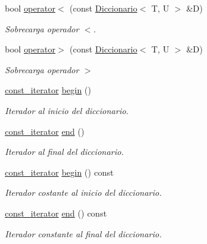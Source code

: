\begin{DoxyCompactItemize}
bool \hyperlink{classDiccionario_ad8ad2b8e7bb2fb099518e6fe2b70e4de}{operator$<$} (const \hyperlink{classDiccionario}{Diccionario}$<$ T, U $>$ \&D)
\begin{DoxyCompactList}\small\item\em Sobrecarga operador $<$. \end{DoxyCompactList}\item 
bool \hyperlink{classDiccionario_aed2afab1a51dd0d9805f294ff078ed7c}{operator$>$} (const \hyperlink{classDiccionario}{Diccionario}$<$ T, U $>$ \&D)
\begin{DoxyCompactList}\small\item\em Sobrecarga operador $>$ \end{DoxyCompactList}\item 
\mbox{\label{classDiccionario_af3c85ed51d02f1d982bf896bc74846a2}} 
\hyperlink{classDiccionario_1_1const__iterator}{const\+\_\+iterator} \hyperlink{classDiccionario_af3c85ed51d02f1d982bf896bc74846a2}{begin} ()
\begin{DoxyCompactList}\small\item\em Iterador al inicio del diccionario. \end{DoxyCompactList}\item 
\mbox{\label{classDiccionario_aa6f9f59a1f6478b7ff61369132fb4061}} 
\hyperlink{classDiccionario_1_1const__iterator}{const\+\_\+iterator} \hyperlink{classDiccionario_aa6f9f59a1f6478b7ff61369132fb4061}{end} ()
\begin{DoxyCompactList}\small\item\em Iterador al final del diccionario. \end{DoxyCompactList}\item 
\mbox{\label{classDiccionario_a0218f5f4801a39ac0c54d0d237d0c4ac}} 
\hyperlink{classDiccionario_1_1const__iterator}{const\+\_\+iterator} \hyperlink{classDiccionario_a0218f5f4801a39ac0c54d0d237d0c4ac}{begin} () const
\begin{DoxyCompactList}\small\item\em Iterador costante al inicio del diccionario. \end{DoxyCompactList}\item 
\mbox{\label{classDiccionario_a7a227d9a397c6936df480011236e9659}} 
\hyperlink{classDiccionario_1_1const__iterator}{const\+\_\+iterator} \hyperlink{classDiccionario_a7a227d9a397c6936df480011236e9659}{end} () const
\begin{DoxyCompactList}\small\item\em Iterador constante al final del diccionario. \end{DoxyCompactList}\end{DoxyCompactItemize}
